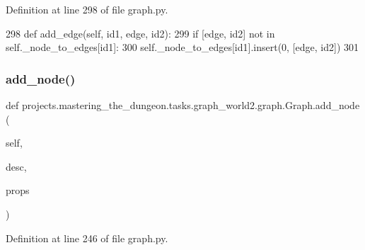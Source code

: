 Definition at line 298 of file graph.\+py.


\begin{DoxyCode}
298     \textcolor{keyword}{def }add\_edge(self, id1, edge, id2):
299         \textcolor{keywordflow}{if} [edge, id2] \textcolor{keywordflow}{not} \textcolor{keywordflow}{in} self.\_node\_to\_edges[id1]:
300             self.\_node\_to\_edges[id1].insert(0, [edge, id2])
301 
\end{DoxyCode}
\mbox{\label{classprojects_1_1mastering__the__dungeon_1_1tasks_1_1graph__world2_1_1graph_1_1Graph_a376c611b33232ca0d9c3381ce46e1dcd}} 
\subsubsection{\texorpdfstring{add\+\_\+node()}{add\_node()}}
{\footnotesize\ttfamily def projects.\+mastering\+\_\+the\+\_\+dungeon.\+tasks.\+graph\+\_\+world2.\+graph.\+Graph.\+add\+\_\+node (\begin{DoxyParamCaption}\item[{}]{self,  }\item[{}]{desc,  }\item[{}]{props }\end{DoxyParamCaption})}



Definition at line 246 of file graph.\+py.


